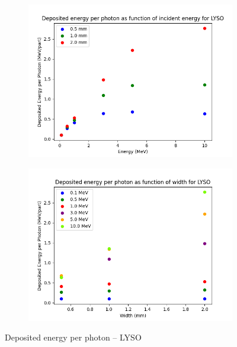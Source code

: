 \documentclass{article}
\begin{document}
\begin{figure}[H]
\centering
\begin{subfigure}{.5\textwidth}
  \centering
  \includegraphics[width=\linewidth]{images/task3/dep_en_LYSO.png}
  \caption{}
\end{subfigure}%
\begin{subfigure}{.5\textwidth}
  \centering
  \includegraphics[width=\linewidth]{images/task3/dep_en_width_LYSO.png}
  \caption{}
\end{subfigure}
\caption{Deposited energy per photon – LYSO}
\end{figure}
\end{document}
